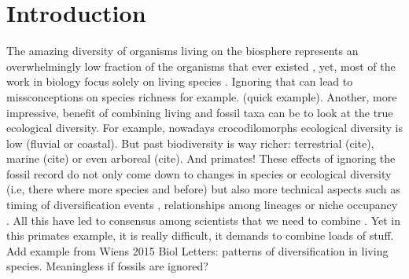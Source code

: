 \chapter{Introduction}
\label{chap:introduction}



%
% 

The amazing diversity of organisms living on the biosphere represents an overwhelmingly low fraction of the organisms that ever existed \citep{novacek1992ext,raup1993extinction}, yet, most of the work in biology focus solely on living species \citep{fritzdiversity2013,benton2015}.
Ignoring that can lead to missconceptions on species richness for example.
(quick example).
Another, more impressive, benefit of combining living and fossil taxa can be to look at the true ecological diversity.
For example, nowadays crocodilomorphs ecological diversity is low (fluvial or coastal).
But past biodiversity is way richer: terrestrial (cite), marine (cite) or even arboreal (cite).
And primates!
These effects of ignoring the fossil record do not only come down to changes in species or ecological diversity (i.e, there where more species and before) but also more technical aspects such as timing of diversification events \citep[e.g.][]{pyrondivergence2011}, relationships among lineages \citep[e.g.][]{manosphylogeny2007} or niche occupancy \citep[e.g.][]{pearmanniche2008}. %
All this have led to consensus among scientists that we need to combine \citep{jacksonwhat2006,quentaldiversity2010,dietlconservation2011,slaterunifying2013,fritzdiversity2013,benton2015}.
Yet in this primates example, it is really difficult, it demands to combine loads of stuff.
Add example from Wiens 2015 Biol Letters: patterns of diversification in living species. Meaningless if fossils are ignored?

